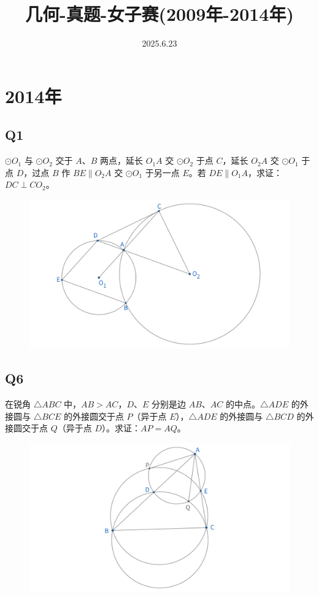 \documentclass{article}
\title{几何-真题-女子赛(2009年-2014年)}
\author{}
\date{2025.6.23}
\begin{document}
\maketitle

\section{2014年}
\subsection{Q1}
$\odot O_1$ 与 $\odot O_2$ 交于 $A$、$B$ 两点，延长 $O_1A$ 交 $\odot O_2$ 于点 $C$，延长 $O_2A$ 交 $\odot O_1$ 于点 $D$，过点 $B$ 作 $BE \parallel O_2A$ 交 $\odot O_1$ 于另一点 $E$。若 $DE \parallel O_1A$，求证：$DC \perp CO_2$。
\begin{figure}[htbp]
    \centering
    \includegraphics[width=0.6\linewidth]{figures/女子赛14年Q1.png}
\end{figure}


\subsection{Q6}
在锐角 $\triangle ABC$ 中，$AB > AC$，$D$、$E$ 分别是边 $AB$、$AC$ 的中点。$\triangle ADE$ 的外接圆与 $\triangle BCE$ 的外接圆交于点 $P$（异于点 $E$），$\triangle ADE$ 的外接圆与 $\triangle BCD$ 的外接圆交于点 $Q$（异于点 $D$）。求证：$AP = AQ$。
\begin{figure}[htbp]
    \centering
    \includegraphics[width=0.7\linewidth]{figures/女子赛14年Q6.png}
\end{figure}
\end{document}
